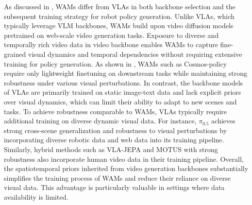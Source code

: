 \documentclass{article}
\begin{document}
As discussed in , WAMs differ from VLAs in both backbone selection and the subsequent training strategy for robot policy generation. Unlike VLAs, which typically leverage VLM backbones, WAMs build upon video diffusion models pretrained on web-scale video generation tasks. Exposure to diverse and temporally rich video data in video backbone enables WAMs to capture fine-grained visual dynamics and temporal dependencies without requiring extensive training for policy generation. As shown in , WAMs such as Cosmos-policy require only lightweight finetuning on downstream tasks while maintaining strong robustness under various visual perturbations. In contrast, the backbone models of VLAs are primarily trained on static image-text data and lack explicit priors over visual dynamics, which can limit their ability to adapt to new scenes and tasks. To achieve robustness comparable to WAMs, VLAs typically require additional training on diverse dynamic visual data. For instance, $\pi_{0.5}$ achieves strong cross-scene generalization and robustness to visual perturbations by incorporating diverse robotic data and web data into its training pipeline. Similarly, hybrid methods such as VLA-JEPA and MOTUS with strong robustness also incorporate human video data in their training pipeline. Overall, the spatiotemporal priors inherited from video generation backbones substantially simplifies the training process of WAMs and reduce their reliance on diverse visual data. This advantage is particularly valuable in settings where data availability is limited.

\end{document}
